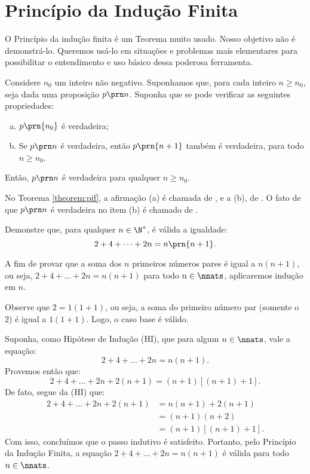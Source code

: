 \section{Princípio da Indução Finita}

O Princípio da indução finita é um Teorema muito usado. Nosso objetivo não é demonstrá-lo. Queremos usá-lo em situações e problemas mais elementares para possibilitar o entendimento e uso básico dessa poderosa ferramenta.

\begin{theorem}
\label{theorem:pif}
Considere $n_0$ um inteiro não negativo. Suponhamos que, para cada inteiro $n \geq n_0$, seja dada uma proposição $p \prn n$. Suponha
que se pode verificar as seguintes propriedades:

\begin{enumerate}[(a)]
  \item $p \prn{n_0}$ é verdadeira;
  \item Se $p \prn n$ é verdadeira, então $p \prn {n+1}$ também
  é verdadeira, para todo $n \geq n_0$.
\end{enumerate}

\noindent Então, $p \prn n$ é verdadeira para qualquer $n \geq n_0$.
\end{theorem}

\begin{remark}
No Teorema \ref{theorem:pif}, a afirmação (a) é chamada de , e a (b), de . O fato de que $p \prn n$ é verdadeira no item (b) é chamado de .
\end{remark}

\begin{example}
Demonstre que, para qualquer $n \in \N^*$, é válida a igualdade:
%
$$2+ 4+ \dots + 2n = n \prn {n+1}.$$
\end{example}


\begin{solution}
	A fim de provar que a soma dos $n$ primeiros números pares é igual a $n(n+1)$, ou seja, $2+4+\dots + 2n = n(n+1)$ para todo $n \in \nnats$, aplicaremos indução em $n$.
	
	Observe que $2 = 1(1+1)$, ou seja, a soma do primeiro número par (somente o 2) é igual a $1(1+1)$. Logo, o caso base é válido.
	
	Suponha, como Hipótese de Indução (HI), que para algum $n \in \nnats$, vale a equação:
	$$2+4+\dots+2n=n(n+1).$$
	Provemos então que:
	$$2+4+\dots + 2n + 2(n+1) = (n+1)[(n+1)+1].$$
	De fato, segue da (HI) que:
	\begin{align*}
	2+4+\dots+2n +2(n+1)	&= n(n+1) + 2(n+1) \\
	&= (n+1)(n+2) \\
	&= (n+1)[(n+1)+1].
	\end{align*}
	Com isso, concluímos que o passo indutivo é satisfeito.
	Portanto, pelo Princípio da Indução Finita, a equação $2+4+\dots + 2n=n(n+1)$ é válida para todo $n \in \nnats$.
	\end{solution}

